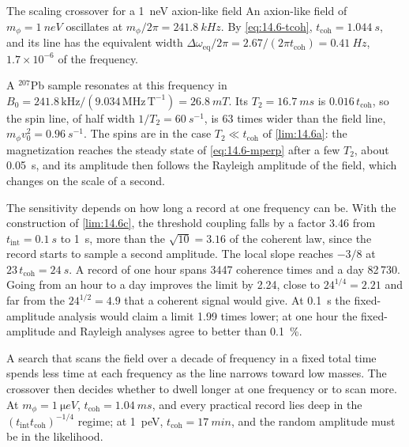 \begin{workedexample}{The scaling crossover for a \SI{1}{neV} axion-like field}\label{we:14-crossover}
An axion-like field of $m_\phi = \SI{1}{neV}$ oscillates at $m_\phi/2\pi = \SI{241.8}{kHz}$. By \cref{eq:14.6-tcoh}, $t_{\mathrm{coh}} = \SI{1.044}{s}$, and its line has the equivalent width $\Delta\omega_{\mathrm{eq}}/2\pi = 2.67/(2\pi t_{\mathrm{coh}}) = \SI{0.41}{Hz}$, $1.7\times10^{-6}$ of the frequency.

A $^{207}$Pb sample resonates at this frequency in $B_0 = 241.8\,\mathrm{kHz}/(9.034\,\mathrm{MHz\,T^{-1}}) = \SI{26.8}{mT}$. Its $T_2 = \SI{16.7}{ms}$ is $0.016\,t_{\mathrm{coh}}$, so the spin line, of half width $1/T_2 = \SI{60}{s^{-1}}$, is 63 times wider than the field line, $m_\phi v_0^2 = \SI{0.96}{s^{-1}}$. The spins are in the case $T_2 \ll t_{\mathrm{coh}}$ of \cref{lim:14.6a}: the magnetization reaches the steady state of \cref{eq:14.6-mperp} after a few $T_2$, about \SI{0.05}{s}, and its amplitude then follows the Rayleigh amplitude of the field, which changes on the scale of a second.

The sensitivity depends on how long a record at one frequency can be. With the construction of \cref{lim:14.6c}, the threshold coupling falls by a factor 3.46 from $t_{\mathrm{int}} = \SI{0.1}{s}$ to \SI{1}{s}, more than the $\sqrt{10} = 3.16$ of the coherent law, since the record starts to sample a second amplitude. The local slope reaches $-3/8$ at $23\,t_{\mathrm{coh}} = \SI{24}{s}$. A record of one hour spans 3447 coherence times and a day 82\,730. Going from an hour to a day improves the limit by 2.24, close to $24^{1/4} = 2.21$ and far from the $24^{1/2} = 4.9$ that a coherent signal would give. At \SI{0.1}{s} the fixed-amplitude analysis would claim a limit 1.99 times lower; at one hour the fixed-amplitude and Rayleigh analyses agree to better than \SI{0.1}{\percent}.
\end{workedexample}

A search that scans the field over a decade of frequency in a fixed total time spends less time at each frequency as the line narrows toward low masses. The crossover then decides whether to dwell longer at one frequency or to scan more. At $m_\phi = \SI{1}{\micro eV}$, $t_{\mathrm{coh}} = \SI{1.04}{ms}$, and every practical record lies deep in the $(t_{\mathrm{int}}t_{\mathrm{coh}})^{-1/4}$ regime; at \SI{1}{peV}, $t_{\mathrm{coh}} = \SI{17}{min}$, and the random amplitude must be in the likelihood.
